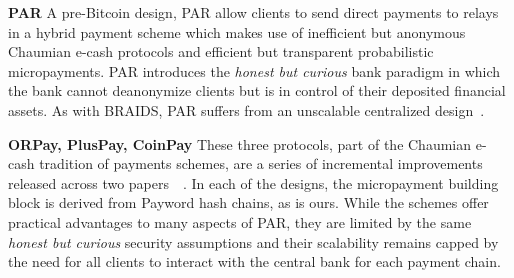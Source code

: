 \textbf{PAR} A pre-Bitcoin design, PAR allow clients to send direct payments to
relays in a hybrid payment scheme which makes use of inefficient but anonymous
Chaumian e-cash protocols and efficient but transparent probabilistic
micropayments. PAR introduces the \emph{honest but curious} bank paradigm in
which the bank cannot deanonymize clients but is in control of their deposited
financial assets. As with BRAIDS, PAR suffers from an unscalable centralized
design~\cite{androulaki2008payment}.

\textbf{ORPay, PlusPay, CoinPay} These three protocols, part of the Chaumian
e-cash tradition of payments schemes, are a series of incremental improvements
released across two papers~\cite{chen2009xpay}~\cite{carbunar2012tipping}. In
each of the designs, the micropayment building block is derived from Payword
hash chains, as is ours. While the schemes offer practical advantages to many
aspects of PAR, they are limited by the same \emph{honest but curious} security
assumptions and their scalability remains capped by the need for all clients to
interact with the central bank for each payment chain.

